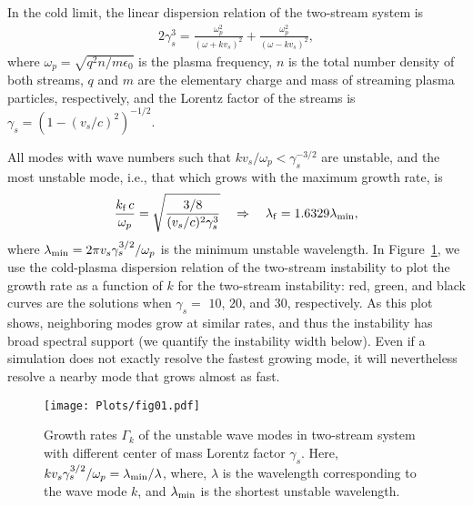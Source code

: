 \documentclass[pop,numberedappendix,iop]{aeb_emulateapj_2015}
\begin{document}
In the cold limit, the linear dispersion relation of the two-stream system is~\citep[e.g.,][]{2s-disperions} 
\begin{eqnarray}
2 \gamma_s^3 = \frac{ \omega^2_p }{ (\omega + k v_s)^2} + \frac{ \omega^2_p }{(\omega - k v_s)^2},
\label{eq:dis_2stream}
\end{eqnarray}
where $\omega_p = \sqrt{ q^2 n / m \epsilon_0}$ is the plasma frequency, $n$ is the total number density of both streams, $q$ and $m$ are the elementary charge and mass of streaming plasma particles, respectively, and the Lorentz factor of the streams is $\gamma_s = ( 1-(v_s/c)^2)^{-1/2}$.

All modes with wave numbers such that $k v_s/\omega_p<\gamma_s^{-3/2}$ are unstable, and the most unstable mode, i.e., that which grows with the maximum growth rate, is
\begin{equation}
\frac{ k_{\rm f} \hspace{.05cm} c }{ \omega_p } = \sqrt{\frac{3/8}{ (v_s/c)^2 \gamma_s^{3}}}
\quad
\Rightarrow
\quad
\lambda_{\rm f } = 1.6329 \lambda_{\rm min},
\end{equation}
where $\lambda_{\rm min} = 2\pi v_s \gamma_s^{3/2} / \omega_p$ is the minimum unstable wavelength. 
In Figure~\ref{fig:2stream}, we use the cold-plasma dispersion relation of the two-stream instability to plot the growth rate as a function of $k$ for the two-stream instability: red, green, and black curves are the solutions when $\gamma_s=$ $10$, $20$, and $30$, respectively.
As this plot shows, neighboring modes grow at similar rates, and thus the instability has broad spectral support (we quantify the instability width below).
Even if a simulation does not exactly resolve the fastest growing mode, it will nevertheless resolve a nearby mode that grows almost as fast.

\begin{figure}
\center
\texttt{[image: Plots/fig01.pdf]}
\caption{
Growth rates $\Gamma_k$ of the unstable wave modes in two-stream system with different center of mass Lorentz factor $\gamma_s$.
Here, $k v_s \gamma_s^{3/2}/\omega_p = \lambda_{\rm min}/\lambda$, where, $\lambda$ is the wavelength corresponding to the wave mode $k$, and  $\lambda_{\rm min}$ is the shortest unstable wavelength.
\label{fig:2stream}
}
\end{figure}
\end{document}

